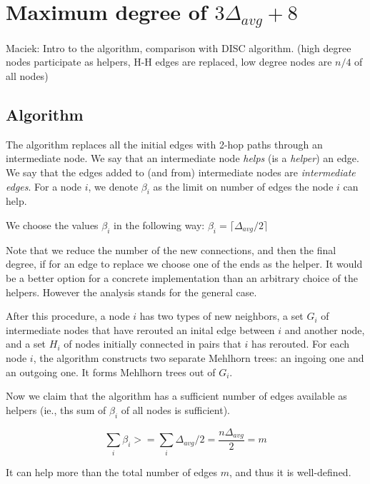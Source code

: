 \documentclass{article}
\begin{document}
\section{Maximum degree of $3\Delta_{avg} + 8$}

Maciek: Intro to the algorithm, comparison with DISC algorithm.
(high degree nodes participate as helpers, H-H edges are replaced, low degree nodes are $n/4$ of all nodes)

\subsection{Algorithm}

The algorithm replaces all the initial edges with 2-hop paths through an intermediate node.
We say that an intermediate node \emph{helps} (is a \emph{helper}) an edge.
We say that the edges added to (and from) intermediate nodes are \emph{intermediate edges}.
For a node $i$, we denote $\beta_i$ as the limit on number of edges the node $i$ can help.

We choose the values $\beta_i$ in the following way: $\beta_i = \lceil\Delta_{avg}/2\rceil$

\medskip

Note that we reduce the number of the new connections, and then the 
final degree, if for an edge to replace we choose one of the ends as
the helper. It would be a better option for a concrete implementation than
an arbitrary choice of the helpers. However the analysis stands for the
general case.

\medskip

After this procedure, a node $i$ has two types of new neighbors, 
a set $G_i$ of intermediate nodes that have rerouted an inital edge
between $i$ and another node, and a set $H_i$ of nodes initially
connected in pairs that $i$ has rerouted. For each node $i$, the algorithm constructs two separate Mehlhorn trees:
an ingoing one and an outgoing one. It forms Mehlhorn trees out of $G_i$.

\medskip

Now we claim that the algorithm has a sufficient number of edges available as helpers
 (ie., ths sum of $\beta_i$ of all nodes is sufficient).

  $$\sum_i \beta_i >= \sum_i \Delta_{avg}/2 = \frac{n\Delta_{avg}}{2} = m$$

It can help more than the total number of edges $m$, and thus it is well-defined.

\medskip
\end{document}
